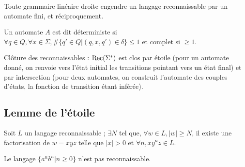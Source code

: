 \documentclass[a4paper]{article}
\begin{document}
\begin{prop}
Toute grammaire linéaire droite engendre un langage reconnaissable par un automate fini, et réciproquement.
\end{prop}

\begin{defi}
Un automate $A$ est dit déterministe si $\forall q\in Q, \forall x\in \Sigma, \#\{q'\in Q | (q, x, q') \in \delta\} \leqslant 1$ et complet si $\geqslant 1$.
\end{defi}

Clôture des reconnaissables : $\textnormal{Rec}(\Sigma^*)$ est clos par étoile (pour un automate donné, on renvoie vers l'état initial les transitions pointant vers un état final) et par intersection (pour deux automates, on construit l'automate des couples d'états, la fonction de transition étant inférée).

\subsection{Lemme de l'étoile}
\begin{lem}
Soit $L$ un langage reconnaissable ; $\exists N$ tel que, $\forall w\in L, |w|\geqslant N$, il existe une factorisation de $w=xyz$ telle que $|x|>0$ et $\forall n, xy^nz\in L$.
\end{lem}

\begin{prop}
Le langage $\{a^nb^n|n\geqslant 0\}$ n'est pas reconnaissable.
\end{prop}
\end{document}

